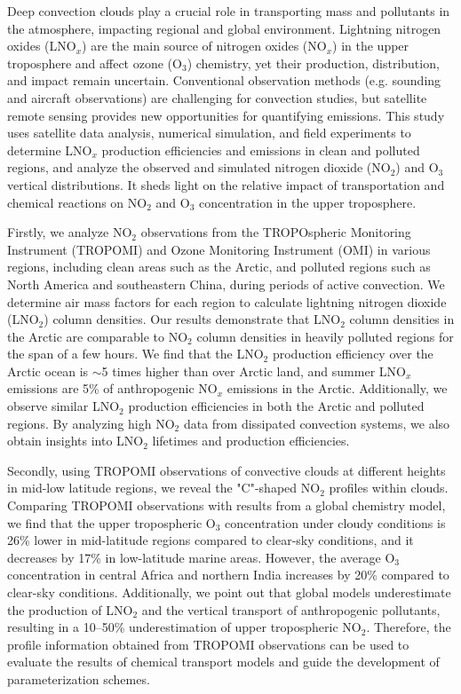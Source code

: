 {
Deep convection clouds play a crucial role in transporting mass and pollutants in the atmosphere, impacting regional and global environment.
Lightning nitrogen oxides (LNO$_x$) are the main source of nitrogen oxides (NO$_x$) in the upper troposphere
and affect ozone (O$_3$) chemistry, yet their production, distribution, and impact remain uncertain.
Conventional observation methods (e.g. sounding and aircraft observations) are challenging for convection studies,
but satellite remote sensing provides new opportunities for quantifying emissions.
This study uses satellite data analysis, numerical simulation, and field experiments to determine LNO$_x$ production efficiencies and emissions in clean and polluted regions,
and analyze the observed and simulated nitrogen dioxide (NO$_2$) and O$_3$ vertical distributions.
It sheds light on the relative impact of transportation and chemical reactions on NO$_2$ and O$_3$ concentration in the upper troposphere.

Firstly, we analyze NO$_2$ observations from the TROPOspheric Monitoring Instrument (TROPOMI) and
Ozone Monitoring Instrument (OMI) in various regions, including clean areas such as the Arctic, and polluted regions such as North America and southeastern China, during periods of active convection.
We determine air mass factors for each region to calculate lightning nitrogen dioxide (LNO$_2$) column densities.
Our results demonstrate that LNO$_2$ column densities in the Arctic are comparable to NO$_2$ column densities in heavily polluted regions for the span of a few hours.
We find that the LNO$_2$ production efficiency over the Arctic ocean is $\sim$5 times higher than over Arctic land, and summer LNO$_x$ emissions are 5\% of anthropogenic NO$_x$ emissions in the Arctic.
Additionally, we observe similar LNO$_2$ production efficiencies in both the Arctic and polluted regions.
By analyzing high NO$_2$ data from dissipated convection systems, we also obtain insights into LNO$_2$ lifetimes and production efficiencies.

Secondly, using TROPOMI observations of convective clouds at different heights in mid-low latitude regions, we reveal the "C"-shaped NO$_2$ profiles within clouds.
Comparing TROPOMI observations with results from a global chemistry model, we find that the upper tropospheric O$_3$ concentration under cloudy conditions is 26\% lower in mid-latitude regions compared to clear-sky conditions, and it decreases by 17\% in low-latitude marine areas.
However, the average O$_3$ concentration in central Africa and northern India increases by 20\% compared to clear-sky conditions.
Additionally, we point out that global models underestimate the production of LNO$_2$ and the vertical transport of anthropogenic pollutants, resulting in a 10--50\% underestimation of upper tropospheric NO$_2$.
Therefore, the profile information obtained from TROPOMI observations can be used to evaluate the results of chemical transport models and guide the development of parameterization schemes.

}
